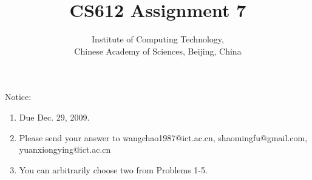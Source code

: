 \documentclass[a4paper,11pt]{article}
\title{CS612 Assignment 7}
\author{Institute of Computing Technology, \\
                       Chinese Academy of Sciences, Beijing, China }
\begin{document}
\maketitle

Notice: \\
\begin{small}
\begin{enumerate}
 \item Due Dec. 29, 2009.\\
\item Please send your answer to wangchao1987@ict.ac.cn, shaomingfu@gmail.com, yuanxiongying@ict.ac.cn\\
\item You can arbitrarily choose two from Problems 1-5.
\end{enumerate}
\end{small}
\end{document}
